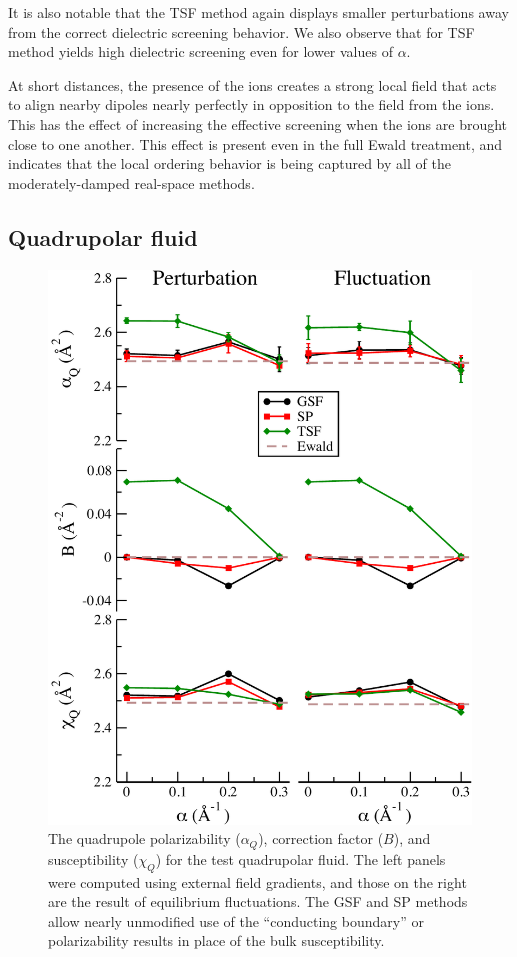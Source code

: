 It is also notable that the TSF method again displays smaller
perturbations away from the correct dielectric screening behavior.  We
also observe that for TSF method yields high dielectric screening even
for lower values of $\alpha$. 

At short distances, the presence of the ions creates a strong local
field that acts to align nearby dipoles nearly perfectly in opposition
to the field from the ions.  This has the effect of increasing the
effective screening when the ions are brought close to one another.
This effect is present even in the full Ewald treatment, and indicates
that the local ordering behavior is being captured by all of the
moderately-damped real-space methods.

\subsection{Quadrupolar fluid}
\begin{figure}
\begin{center}
\includegraphics[width=4.5in]{polarizabilityFinal_Quad.pdf}
\caption{The quadrupole polarizability ($\alpha_Q$), correction factor
  ($B$), and susceptibility ($\chi_Q$) for the test quadrupolar
  fluid. The left panels were computed using external field gradients,
  and those on the right are the result of equilibrium fluctuations.
  The GSF and SP methods allow nearly unmodified use of the
  ``conducting boundary'' or polarizability results in place of the
  bulk susceptibility.}
\label{fig:dielectricQuad}
\end{center}
\end{figure}
